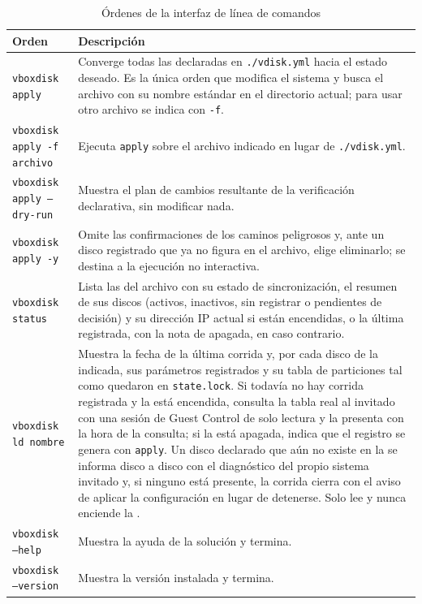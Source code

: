 \begin{table}[H]
    \centering
    \caption{Órdenes de la interfaz de línea de comandos}
    \label{tab:comandos}
    \begin{tabular}{@{}lp{9.4cm}@{}}
        \toprule
        \textbf{Orden} & \textbf{Descripción} \\
        \midrule
        \texttt{vboxdisk apply} & Converge todas las \vm{} declaradas en \texttt{./vdisk.yml} hacia el estado deseado. Es la única orden que modifica el sistema y busca el archivo con su nombre estándar en el directorio actual; para usar otro archivo se indica con \texttt{-f}. \\
        \texttt{vboxdisk apply -f archivo} & Ejecuta \texttt{apply} sobre el archivo indicado en lugar de \texttt{./vdisk.yml}. \\
        \texttt{vboxdisk apply --dry-run} & Muestra el plan de cambios resultante de la verificación declarativa, sin modificar nada. \\
        \texttt{vboxdisk apply -y} & Omite las confirmaciones de los caminos peligrosos y, ante un disco registrado que ya no figura en el archivo, elige eliminarlo; se destina a la ejecución no interactiva. \\
        \texttt{vboxdisk status} & Lista las \vm{} del archivo con su estado de sincronización, el resumen de sus discos (activos, inactivos, sin registrar o pendientes de decisión) y su dirección IP actual si están encendidas, o la última registrada, con la nota de apagada, en caso contrario. \\
        \texttt{vboxdisk ld nombre} & Muestra la fecha de la última corrida y, por cada disco de la \vm{} indicada, sus parámetros registrados y su tabla de particiones tal como quedaron en \texttt{state.lock}. Si todavía no hay corrida registrada y la \vm{} está encendida, consulta la tabla real al invitado con una sesión de Guest Control de solo lectura y la presenta con la hora de la consulta; si la \vm{} está apagada, indica que el registro se genera con \texttt{apply}. Un disco declarado que aún no existe en la \vm{} se informa disco a disco con el diagnóstico del propio sistema invitado y, si ninguno está presente, la corrida cierra con el aviso de aplicar la configuración en lugar de detenerse. Solo lee y nunca enciende la \vm{}. \\
        \texttt{vboxdisk --help} & Muestra la ayuda de la solución y termina. \\
        \texttt{vboxdisk --version} & Muestra la versión instalada y termina. \\
        \bottomrule
    \end{tabular}
\end{table}

